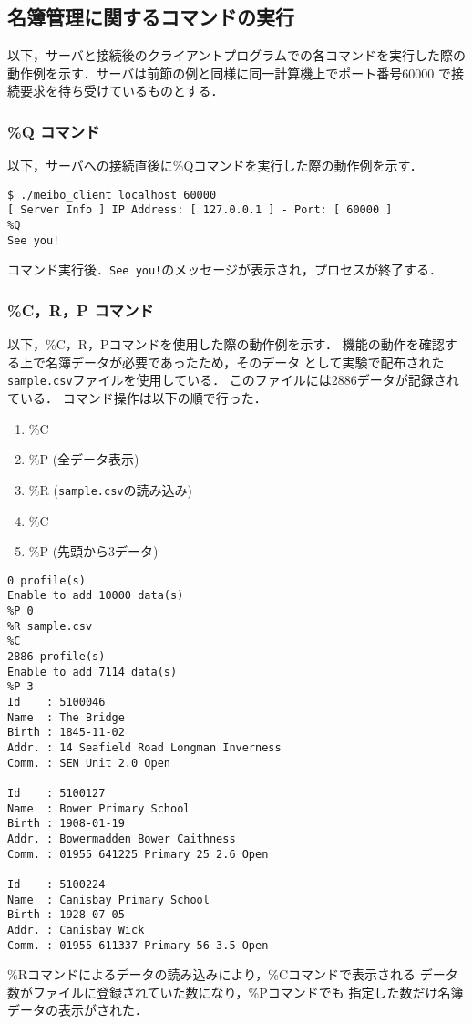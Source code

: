 \subsection{名簿管理に関するコマンドの実行}
以下，サーバと接続後のクライアントプログラムでの各コマンドを実行した際の
動作例を示す．サーバは前節の例と同様に同一計算機上でポート番号60000
で接続要求を待ち受けているものとする．

\subsubsection{\%Q コマンド}
以下，サーバへの接続直後に\%Qコマンドを実行した際の動作例を示す．

\begin{Verbatim}[numbers=none, numbersep=6pt, frame=single,
  fontsize=\small, baselinestretch=0.8]
$ ./meibo_client localhost 60000
[ Server Info ] IP Address: [ 127.0.0.1 ] - Port: [ 60000 ]
%Q
See you!
\end{Verbatim}
コマンド実行後．\verb|See you!|のメッセージが表示され，プロセスが終了する．

\subsubsection{\%C，R，P コマンド}
以下，\%C，R，Pコマンドを使用した際の動作例を示す．
機能の動作を確認する上で名簿データが必要であったため，そのデータ
として実験で配布された\verb|sample.csv|ファイルを使用している．
このファイルには2886データが記録されている．
コマンド操作は以下の順で行った．
\begin{enumerate}
  \item \%C
  \item \%P (全データ表示)
  \item \%R (\verb|sample.csv|の読み込み)
  \item \%C
  \item \%P (先頭から3データ)
\end{enumerate}
\begin{Verbatim}[numbers=none, numbersep=6pt, frame=single,
  fontsize=\small, baselinestretch=0.8]
%C
0 profile(s)
Enable to add 10000 data(s)
%P 0
%R sample.csv
%C
2886 profile(s)
Enable to add 7114 data(s)
%P 3
Id    : 5100046
Name  : The Bridge
Birth : 1845-11-02
Addr. : 14 Seafield Road Longman Inverness
Comm. : SEN Unit 2.0 Open

Id    : 5100127
Name  : Bower Primary School
Birth : 1908-01-19
Addr. : Bowermadden Bower Caithness
Comm. : 01955 641225 Primary 25 2.6 Open

Id    : 5100224
Name  : Canisbay Primary School
Birth : 1928-07-05
Addr. : Canisbay Wick
Comm. : 01955 611337 Primary 56 3.5 Open  
\end{Verbatim}
\%Rコマンドによるデータの読み込みにより，\%Cコマンドで表示される
データ数がファイルに登録されていた数になり，\%Pコマンドでも
指定した数だけ名簿データの表示がされた．

